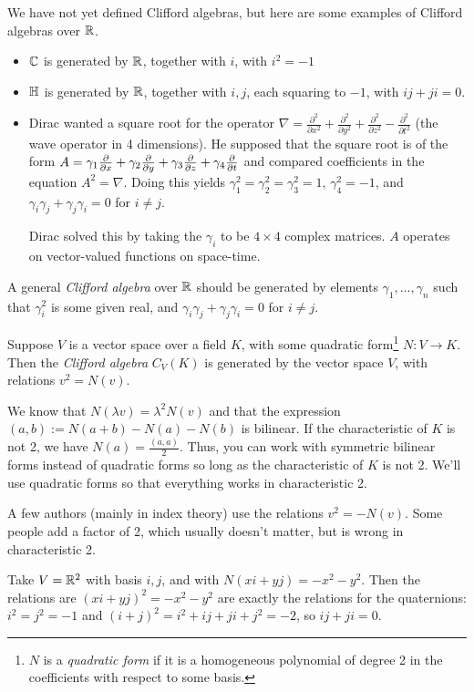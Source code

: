  \begin{example}
   We have not yet defined Clifford algebras, but here are some examples of Clifford
   algebras over $\mathbb{R}$.
  \begin{itemize}
   \item $\mathbb{C}$ is generated by $\mathbb{R}$, together with $i$, with $i^2=-1$
   \item $\mathbb{H}$ is generated by $\mathbb{R}$, together with $i,j$, each squaring to $-1$, with
   $ij+ji=0$.

   \item Dirac wanted a square root for the operator $\nabla =
   \frac{\partial^2}{\partial x^2} + \frac{\partial^2}{\partial y^2}+
   \frac{\partial^2}{\partial z^2} - \frac{\partial^2}{\partial t^2}$ (the wave
   operator in 4 dimensions). He supposed that the square root is of the form $A =
   \gamma_1\frac{\partial }{\partial x}+\gamma_2\frac{\partial }{\partial y}+\gamma_3\frac{\partial }{\partial z}+\gamma_4\frac{\partial }{\partial t}$ and
   compared coefficients in the equation $A^2=\nabla$. Doing this yields
   $\gamma_1^2=\gamma_2^2=\gamma_3^2=1$, $\gamma_4^2=-1$, and
   $\gamma_i\gamma_j+\gamma_j\gamma_i=0$ for $i\neq j$.

   Dirac solved this by taking the $\gamma_i$ to be $4\times 4$ complex matrices. $A$
   operates on vector-valued functions on space-time.
 \end{itemize}
\end{example}
\begin{definition}
   A general \emph{Clifford algebra} over $\mathbb{R}$ should be generated by elements
   $\gamma_1,\dots, \gamma_n$ such that $\gamma_i^2$ is some given real, and
   $\gamma_i\gamma_j+\gamma_j\gamma_i=0$ for $i\neq j$.
 \end{definition}
 \begin{definition}
   Suppose $V$ is a vector space over a field $K$, with some quadratic
   form\footnote{$N$ is a \emph{quadratic form} if it is a
   homogeneous polynomial of degree 2 in the coefficients with respect to some basis.}
   $N:V\to K$. Then the \emph{Clifford algebra} $C_V(K)$ is generated by the vector
   space $V$, with relations $v^2 = N(v)$.
 \end{definition}
 We know that $N(\lambda v) = \lambda^2N(v)$ and that the expression $(a,b) :=
 N(a+b)-N(a)-N(b)$ is bilinear. If the characteristic of $K$ is not 2, we have
 $N(a)=\frac{(a,a)}{2}$. Thus, you can work with symmetric bilinear forms instead of
 quadratic forms so long as the characteristic of $K$ is not 2. We'll use quadratic
 forms so that everything works in characteristic 2.
 \begin{warning}
   A few authors (mainly in index theory) use the relations $v^2=-N(v)$.
%
%
   Some people add a factor of 2, which usually doesn't matter, but is wrong in
   characteristic 2.
 \end{warning}
 \begin{example}
   Take $V=\mathbb{R}^2$ with basis $i,j$, and with $N(xi+yj)=-x^2-y^2$. Then the relations
   are $(xi+yj)^2=-x^2-y^2$ are exactly the relations for the quaternions:
   $i^2=j^2=-1$ and $(i+j)^2 = i^2+ij+ji+j^2=-2$, so $ij+ji=0$.
 \end{example}


